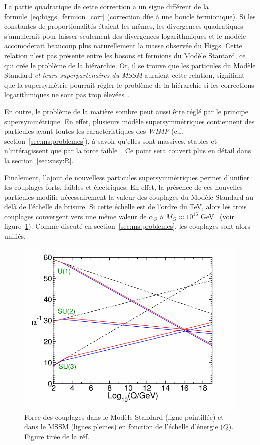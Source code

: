 La partie quadratique de cette correction a un signe différent de la
formule~\ref{eq:higgs_fermion_corr} (correction dûe à une boucle
fermionique). Si les constantes de proportionalités étaient les mêmes,
les divergences quadratiques s'annulerait pour laisser seulement des
divergences logarithmiques et le modèle accomoderait beaucoup plus
naturellement la masse observée du Higgs. Cette relation n'est pas
présente entre les bosons et fermions du Modèle Stantard, ce qui crée
le problème de la hiérarchie.  Or, il se trouve que les particules du
Modèle Standard \emph{et leurs superpartenaires du MSSM} auraient
cette relation, signifiant que la supersymétrie pourrait régler le
problème de la hiérarchie si les corrections logarithmiques ne sont
pas trop élevées~\cite{martin_supersymmetry_1997}.

En outre, le problème de la matière sombre peut aussi être réglé par
le principe supersymmétrique. En effet, plusieurs modèle
supersymmétriques contiennent des particules ayant toutes les
caractéristiques des \emph{WIMP}
(c.f. section~\ref{sec:ms:problemes}), à savoir qu'elles sont
massives, stables et n'intéragissent que par la force
faible~\cite{olive_susy1_2014}. Ce point sera couvert plus en détail
dans la section~\ref{sec:susy:R}.

Finalement, l'ajout de nouvelless particules supersymmétriques permet
d'unifier les couplages forts, faibles et électriques. En effet, la
présence de ces nouvelles particules modifie nécessairement la valeur
des couplages du Modèle Standard au-delà de l'échelle de brisure. Si
cette échelle est de l'ordre du TeV, alors les trois couplages
convergent vers une même valeur de $\alpha_G$ à $M_G \approx 10^{16}$
GeV~\cite{thomson_modern_2013} (voir figure~\ref{fig:unification}).
Comme discuté en section~\ref{sec:ms:problemes}, les couplages sont
alors unifiés.

\begin{figure}
  \centering
  \includegraphics{running_susy.pdf}
  \caption{Force des couplages dans le Modèle Standard (ligne
    pointillée) et dans le MSSM (lignes pleines) en fonction de
    l'échelle d'énergie ($Q$). Figure tirée de la
    réf.~\cite{martin_supersymmetry_1997}}
  \label{fig:unification}
\end{figure}

